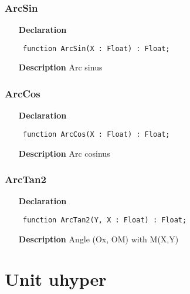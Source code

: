 \documentclass[12pt,a4paper,oneside]{report}
\newcommand{\declarationitem}[1]{\textbf{#1}}
\newcommand{\descriptiontitle}[1]{\textbf{#1}}
\newcommand{\code}[1]{\texttt{#1}}
\begin{document}
\subsubsection{ArcSin}
\label{utrigo-ArcSin}
\begin{itemize}\item[\declarationitem{Declaration}\hfill]
	\begin{flushleft}
		\code{
			function ArcSin(X : Float) : Float;}
		
	\end{flushleft}
	
	\par
	\item[\descriptiontitle{Description}]
	Arc sinus
	
\end{itemize}
\subsubsection{ArcCos}
\label{utrigo-ArcCos}
\begin{itemize}\item[\declarationitem{Declaration}\hfill]
	\begin{flushleft}
		\code{
			function ArcCos(X : Float) : Float;}
		
	\end{flushleft}
	
	\par
	\item[\descriptiontitle{Description}]
	Arc cosinus
	
\end{itemize}
\subsubsection{ArcTan2}
\label{utrigo-ArcTan2}
\begin{itemize}\item[\declarationitem{Declaration}\hfill]
	\begin{flushleft}
		\code{
			function ArcTan2(Y, X : Float) : Float;}
		
	\end{flushleft}
	
	\par
	\item[\descriptiontitle{Description}]
	Angle (Ox, OM) with M(X,Y)
	
\end{itemize}

\section{Unit uhyper}
\label{uhyper}
\end{document}
